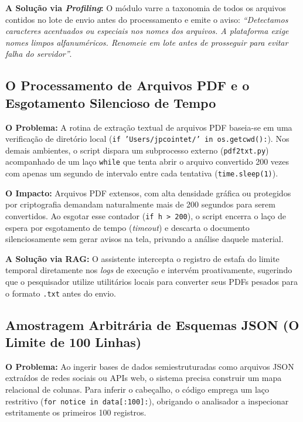\documentclass[
	oneside,
	a4paper,
	12pt,
	chapter=TITLE,
	section=TITLE,
	english,
	brazilian
]{abntex2}
\begin{document}
\begin{apendicesenv}
\textbf{A Solução via \textit{Profiling}:} O módulo varre a taxonomia de todos os arquivos contidos no lote de envio antes do processamento e emite o aviso: \textit{``Detectamos caracteres acentuados ou especiais nos nomes dos arquivos. A plataforma exige nomes limpos alfanuméricos. Renomeie em lote antes de prosseguir para evitar falha do servidor''}.

\FloatBarrier
\subsection{O Processamento de Arquivos PDF e o Esgotamento Silencioso de Tempo}\label{sec:o_processamento_de_arquivos_pdf_e_o_esgo}


\textbf{O Problema:} A rotina de extração textual de arquivos PDF baseia-se em uma verificação de diretório local (\texttt{if 'Users/\allowbreak jpcointet/' in os.\allowbreak getcwd():}). Nos demais ambientes, o script dispara um subprocesso externo (\texttt{pdf2txt.\allowbreak py}) acompanhado de um laço \texttt{while} que tenta abrir o arquivo convertido 200 vezes com apenas um segundo de intervalo entre cada tentativa (\texttt{time.\allowbreak sleep(1)}).

\textbf{O Impacto:} Arquivos PDF extensos, com alta densidade gráfica ou protegidos por criptografia demandam naturalmente mais de 200 segundos para serem convertidos. Ao esgotar esse contador (\texttt{if h > 200}), o script encerra o laço de espera por esgotamento de tempo (\textit{timeout}) e descarta o documento silenciosamente sem gerar avisos na tela, privando a análise daquele material.

\textbf{A Solução via RAG:} O assistente intercepta o registro de estafa do limite temporal diretamente nos \textit{logs} de execução e intervém proativamente, sugerindo que o pesquisador utilize utilitários locais para converter seus PDFs pesados para o formato \texttt{.txt} antes do envio.

\FloatBarrier
\subsection{Amostragem Arbitrária de Esquemas JSON (O Limite de 100 Linhas)}\label{sec:amostragem_arbitraria_de_esquemas_json_o}


\textbf{O Problema:} Ao ingerir bases de dados semiestruturadas como arquivos JSON extraídos de redes sociais ou APIs web, o sistema precisa construir um mapa relacional de colunas. Para inferir o cabeçalho, o código emprega um laço restritivo (\texttt{for notice in data[:100]:}), obrigando o analisador a inspecionar estritamente os primeiros 100 registros.


\end{apendicesenv}
\end{document}
